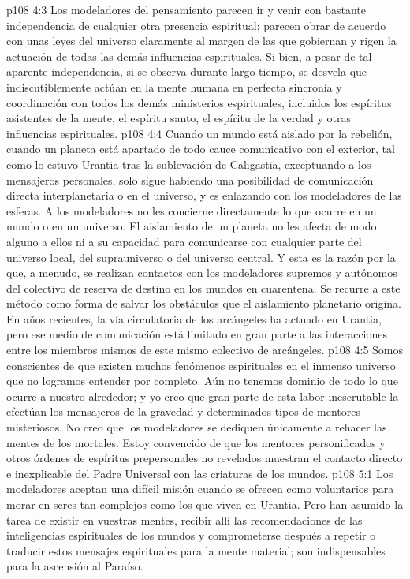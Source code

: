 \vs p108 4:3 Los modeladores del pensamiento parecen ir y venir con bastante independencia de cualquier otra presencia espiritual; parecen obrar de acuerdo con unas leyes del universo claramente al margen de las que gobiernan y rigen la actuación de todas las demás influencias espirituales. Si bien, a pesar de tal aparente independencia, si se observa durante largo tiempo, se desvela que indiscutiblemente actúan en la mente humana en perfecta sincronía y coordinación con todos los demás ministerios espirituales, incluidos los espíritus asistentes de la mente, el espíritu santo, el espíritu de la verdad y otras influencias espirituales.
\vs p108 4:4 Cuando un mundo está aislado por la rebelión, cuando un planeta está apartado de todo cauce comunicativo con el exterior, tal como lo estuvo Urantia tras la sublevación de Caligastia, exceptuando a los mensajeros personales, solo sigue habiendo una posibilidad de comunicación directa interplanetaria o en el universo, y es enlazando con los modeladores de las esferas. A los modeladores no les concierne directamente lo que ocurre en un mundo o en un universo. El aislamiento de un planeta no les afecta de modo alguno a ellos ni a su capacidad para comunicarse con cualquier parte del universo local, del suprauniverso o del universo central. Y esta es la razón por la que, a menudo, se realizan contactos con los modeladores supremos y autónomos del colectivo de reserva de destino en los mundos en cuarentena. Se recurre a este método como forma de salvar los obstáculos que el aislamiento planetario origina. En años recientes, la vía circulatoria de los arcángeles ha actuado en Urantia, pero ese medio de comunicación está limitado en gran parte a las interacciones entre los miembros mismos de este mismo colectivo de arcángeles.
\vs p108 4:5 \pc Somos conscientes de que existen muchos fenómenos espirituales en el inmenso universo que no logramos entender por completo. Aún no tenemos dominio de todo lo que ocurre a nuestro alrededor; y yo creo que gran parte de esta labor inescrutable la efectúan los mensajeros de la gravedad y determinados tipos de mentores misteriosos. No creo que los modeladores se dediquen únicamente a rehacer las mentes de los mortales. Estoy convencido de que los mentores personificados y otros órdenes de espíritus prepersonales no revelados muestran el contacto directo e inexplicable del Padre Universal con las criaturas de los mundos.
\vs p108 5:1 Los modeladores aceptan una difícil misión cuando se ofrecen como voluntarios para morar en seres tan complejos como los que viven en Urantia. Pero han asumido la tarea de existir en vuestras mentes, recibir allí las recomendaciones de las inteligencias espirituales de los mundos y comprometerse después a repetir o traducir estos mensajes espirituales para la mente material; son indispensables para la ascensión al Paraíso.
